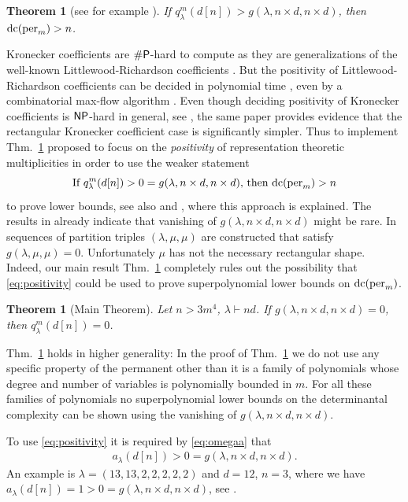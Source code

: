 \documentclass{article}
\numberwithin{equation}{section}
\newtheorem{theorem}[equation]{Theorem}
\theoremstyle{definition}
\def\la{\lambda}
\newcommand{\dcorig}{\textup{dc}}
\newcommand{\per}{\textup{per}}
\newcommand{\sharpP}{\textup{\textsf{\#P}}}
\newcommand{\NP}{\textup{\textsf{NP}}}
\begin{document}
\begin{theorem}[{see for example \cite[eq.~(5.2.7)]{BLMW:11}}]\label{thm:strategy}
If $q^m_\la(d[n]) > g(\la,n \times d, n\times d)$, then $\dcorig(\per_m)>n$.
\end{theorem}
Kronecker coefficients are $\sharpP$-hard to compute
as they are generalizations of the well-known
Littlewood-Richardson coefficients \cite{nara:06}.
But the positivity of Littlewood-Richardson coefficients can be decided in polynomial time \cite{deloera:06,MNS:12},
even by a combinatorial max-flow algorithm \cite{bi:12}.
Even though deciding positivity of Kronecker coefficients is $\NP$-hard in general, see \cite{IMW:15},
the same paper provides evidence that the rectangular Kronecker coefficient case is significantly simpler.
Thus to implement Thm.~\ref{thm:strategy} \cite{gct2} proposed to focus on the \emph{positivity} of representation theoretic multiplicities
in order to use the weaker statement
\begin{equation}\label{eq:positivity}
\text{If $q^m_\la(d[n]) > 0 = g(\la,n \times d, n\times d)$, then $\dcorig(\per_m)>n$}
\end{equation}
to prove lower bounds, see also \cite[Sec.~6.6]{Lan:13} and \cite[Problem~3.13]{Bur:15}, where this approach is explained.
The results in \cite{bci:09, BHI:15, Kum:15} already indicate that vanishing of $g(\la,n \times d, n\times d)$ might be rare.
In \cite{IMW:15} sequences of partition triples $(\la,\mu,\mu)$ are constructed that satisfy $g(\la,\mu,\mu)=0$.
Unfortunately $\mu$ has not the necessary rectangular shape.
Indeed, our main result Thm.~\ref{thm:together} completely rules out the possibility
that \eqref{eq:positivity} could be used to prove superpolynomial lower bounds on $\dcorig(\per_m)$.
\begin{theorem}[Main Theorem]\label{thm:together}
Let $n>3m^4$, $\la \vdash nd$. If $g(\la,n \times d, n \times d)=0$, then $q^m_\la(d[n])=0$.
\end{theorem}
Thm.~\ref{thm:together} holds in higher generality:
In the proof of Thm.~\ref{thm:together} we do not use any specific property of the permanent other than it is a
family of polynomials whose degree and number of variables is polynomially bounded in $m$.
For all these families of polynomials no superpolynomial lower bounds on the determinantal complexity can be shown
using the vanishing of $g(\la,n \times d, n \times d)$.

To use \eqref{eq:positivity} it is required by \eqref{eq:omegaa} that
\begin{align}
a_\la(d[n]) > 0 = g(\la,n \times d, n\times d).
\end{align}
An example is $\la=(13,13,2,2,2,2,2)$ and $d=12$, $n=3$, where we have $a_\la(d[n]) =1 > 0 = g(\la,n \times d, n\times d)$, see \cite[Appendix]{Ike:12b}.
\end{document}

